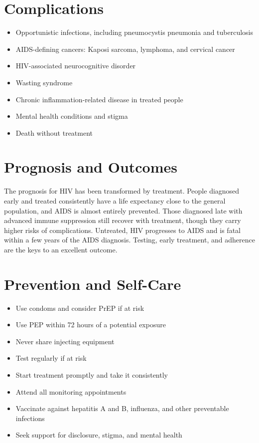 \section*{Complications}
\begin{itemize}
    \item Opportunistic infections, including pneumocystis pneumonia and tuberculosis
    \item AIDS-defining cancers: Kaposi sarcoma, lymphoma, and cervical cancer
    \item HIV-associated neurocognitive disorder
    \item Wasting syndrome
    \item Chronic inflammation-related disease in treated people
    \item Mental health conditions and stigma
    \item Death without treatment
\end{itemize}

\section*{Prognosis and Outcomes}
The prognosis for HIV has been transformed by treatment. People diagnosed early and treated consistently have a life expectancy close to the general population, and AIDS is almost entirely prevented. Those diagnosed late with advanced immune suppression still recover with treatment, though they carry higher risks of complications. Untreated, HIV progresses to AIDS and is fatal within a few years of the AIDS diagnosis. Testing, early treatment, and adherence are the keys to an excellent outcome.

\section*{Prevention and Self-Care}
\begin{itemize}
    \item Use condoms and consider PrEP if at risk
    \item Use PEP within 72 hours of a potential exposure
    \item Never share injecting equipment
    \item Test regularly if at risk
    \item Start treatment promptly and take it consistently
    \item Attend all monitoring appointments
    \item Vaccinate against hepatitis A and B, influenza, and other preventable infections
    \item Seek support for disclosure, stigma, and mental health
\end{itemize}

